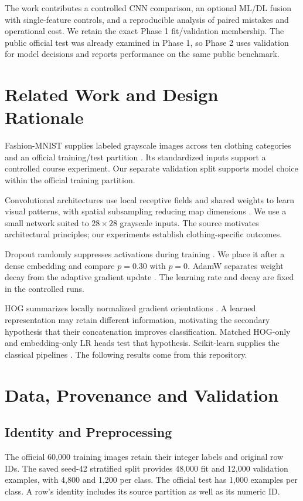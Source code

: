 \documentclass[conference]{IEEEtran}
\begin{document}
The work contributes a controlled CNN comparison, an optional ML/DL fusion with
single-feature controls, and a reproducible analysis of paired mistakes and
operational cost. We retain the exact Phase 1 fit/validation membership. The
public official test was already examined in Phase 1, so Phase 2 uses validation
for model decisions and reports performance on the same public benchmark.

\section{Related Work and Design Rationale}
Fashion-MNIST supplies labeled grayscale images across ten clothing categories
and an official training/test partition \cite{xiao2017fashion}. Its standardized
inputs support a controlled course experiment. Our separate validation split
supports model choice within the official training partition.

Convolutional architectures use local receptive fields and shared weights to
learn visual patterns, with spatial subsampling reducing map dimensions
\cite{lecun1998gradient}. We use a small network suited to $28\times28$ grayscale
inputs. The source motivates architectural principles; our experiments establish
clothing-specific outcomes.

Dropout randomly suppresses activations during training \cite{srivastava2014dropout}.
We place it after a dense embedding and compare $p=0.30$ with $p=0$. AdamW
separates weight decay from the adaptive gradient update \cite{loshchilov2019adamw}.
The learning rate and decay are fixed in the controlled runs.

HOG summarizes locally normalized gradient orientations \cite{dalal2005hog}.
A learned representation may retain different information, motivating the
secondary hypothesis that their concatenation improves classification. Matched
HOG-only and embedding-only LR heads test that hypothesis. Scikit-learn supplies
the classical pipelines \cite{pedregosa2011sklearn}. The following results come from this repository.

\section{Data, Provenance and Validation}
\subsection{Identity and Preprocessing}
The official 60,000 training images retain their integer labels and original
row IDs. The saved seed-42 stratified split provides 48,000 fit and 12,000
validation examples, with 4,800 and 1,200 per class. The official test has 1,000
examples per class. A row's identity includes its source partition as well as
its numeric ID.
\end{document}
